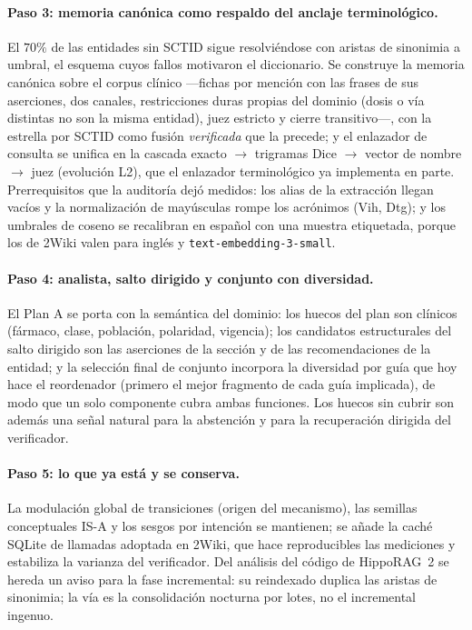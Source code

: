 \documentclass[11pt,a4paper]{article}
\newcommand{\hippo}{HippoRAG~2}
\begin{document}
\paragraph{Paso 3: memoria canónica como respaldo del anclaje terminológico.}
El $70\%$ de las entidades sin SCTID sigue resolviéndose con aristas de
sinonimia a umbral, el esquema cuyos fallos motivaron el diccionario. Se
construye la memoria canónica sobre el corpus clínico ---fichas por
mención con las frases de sus aserciones, dos canales, restricciones
duras propias del dominio (dosis o vía distintas no son la misma
entidad), juez estricto y cierre transitivo---, con la estrella por SCTID
como fusión \emph{verificada} que la precede; y el enlazador de consulta
se unifica en la cascada exacto $\to$ trigramas Dice $\to$ vector de
nombre $\to$ juez (evolución L2), que el enlazador terminológico ya
implementa en parte. Prerrequisitos que la auditoría dejó medidos: los
alias de la extracción llegan vacíos y la normalización de mayúsculas
rompe los acrónimos (\guillemotleft{}Vih\guillemotright{}, \guillemotleft{}Dtg\guillemotright{}); y los umbrales de coseno se
recalibran en español con una muestra etiquetada, porque los de 2Wiki
valen para inglés y \texttt{text-embedding-3-small}.

\paragraph{Paso 4: analista, salto dirigido y conjunto con diversidad.}
El Plan A se porta con la semántica del dominio: los huecos del plan son
clínicos (fármaco, clase, población, polaridad, vigencia); los
candidatos estructurales del salto dirigido son las aserciones de la
sección y de las recomendaciones de la entidad; y la selección final de
conjunto incorpora la diversidad por guía que hoy hace el reordenador
(primero el mejor fragmento de cada guía implicada), de modo que un solo
componente cubra ambas funciones. Los huecos sin cubrir son además una
señal natural para la abstención y para la recuperación dirigida del
verificador.

\paragraph{Paso 5: lo que ya está y se conserva.}
La modulación global de transiciones (origen del mecanismo), las
semillas conceptuales IS-A y los sesgos por intención se mantienen; se
añade la caché SQLite de llamadas adoptada en 2Wiki, que hace
reproducibles las mediciones y estabiliza la varianza del verificador.
Del análisis del código de \hippo{} se hereda un aviso para la fase
incremental: su reindexado duplica las aristas de sinonimia; la vía es la
consolidación nocturna por lotes, no el incremental ingenuo.
\end{document}
